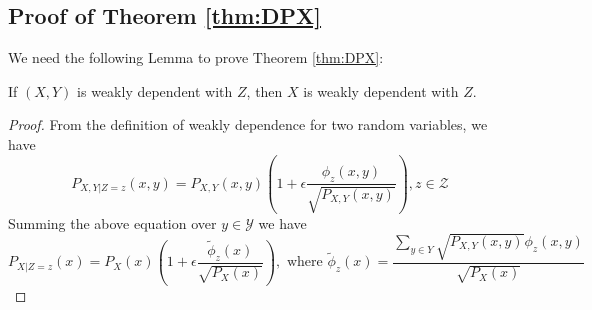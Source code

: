 \subsection{Proof of Theorem \ref{thm:DPX}}
We need the following Lemma to prove Theorem \ref{thm:DPX}:
\begin{lemma}\label{lem:xyz}
	If $(X,Y)$ is weakly dependent with $Z$, then $X$ is weakly dependent with $Z$.
\end{lemma}
\begin{proof}
	From the definition of weakly dependence for two random variables, we have
	\begin{equation}
	P_{X,Y|Z=z}(x,y) = P_{X,Y}(x,y)(1+\epsilon \frac{\phi_z(x,y)}{\sqrt{P_{X,Y}(x,y)}}), z \in \mathcal{Z}
	\end{equation}
	Summing the above equation over $y\in \mathcal{Y}$ we have
	\begin{equation}
	P_{X|Z=z}(x) = P_X(x)(1+\epsilon\frac{\tilde{\phi}_z(x)}{\sqrt{P_X(x)}}),
	\textrm{ where } \tilde{\phi}_z(x) = \frac{\sum_{y\in Y} \sqrt{P_{X,Y}(x,y) }\phi_z(x,y)}{\sqrt{P_X(x)}}
	\end{equation}
\end{proof}
